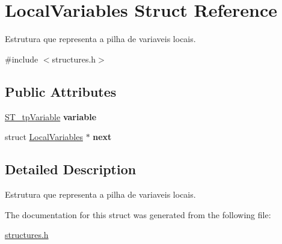 \hypertarget{structLocalVariables}{}\section{Local\+Variables Struct Reference}
\label{structLocalVariables}


Estrutura que representa a pilha de variaveis locais.  




{\ttfamily \#include $<$structures.\+h$>$}

\subsection*{Public Attributes}
\begin{DoxyCompactItemize}
\item 
\mbox{\label{structLocalVariables_ac09af5b94d35a033fe3b7230a3fd60b6}} 
\mbox{\hyperlink{structVariable}{S\+T\+\_\+tp\+Variable}} {\bfseries variable}
\item 
\mbox{\label{structLocalVariables_a22c7944ac481639eb8e5bb76893b459d}} 
struct \mbox{\hyperlink{structLocalVariables}{Local\+Variables}} $\ast$ {\bfseries next}
\end{DoxyCompactItemize}


\subsection{Detailed Description}
Estrutura que representa a pilha de variaveis locais. 

The documentation for this struct was generated from the following file\+:\begin{DoxyCompactItemize}
\item 
\mbox{\hyperlink{structures_8h}{structures.\+h}}\end{DoxyCompactItemize}
